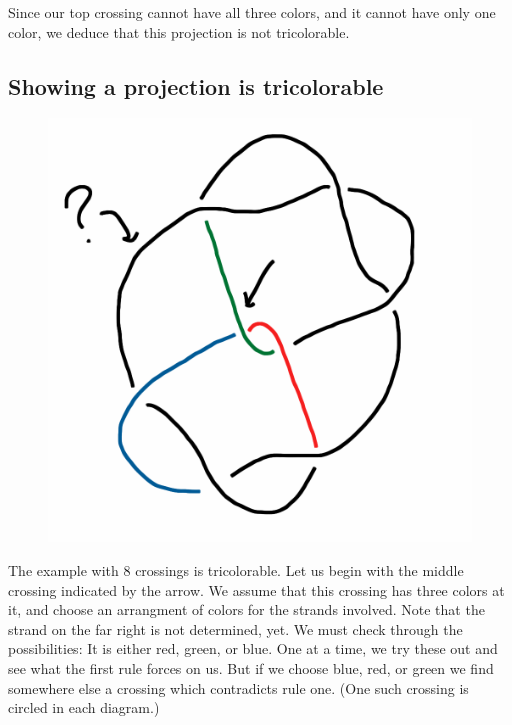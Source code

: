 \documentclass[12pt,letterpaper]{article}
\theoremstyle{definition}
\begin{document}
Since our top crossing cannot have all three colors, and it cannot have only one color, we deduce that this projection is not tricolorable.

\subsection*{Showing a projection is tricolorable}

\begin{figure}
    \centering
    \includegraphics[width=.3\textwidth]{knotpics/colorable1.png}
\end{figure}
The example with 8 crossings is tricolorable.
Let us begin with the middle crossing indicated by the arrow.
We assume that this crossing has three colors at it, and choose an arrangment of colors for the strands involved.
Note that the strand on the far right is not determined, yet.
We must check through the possibilities: It is either red, green, or blue. 
One at a time, we try these out and see what the first rule forces on us.
But if we choose blue, red, or green we find somewhere else a crossing which contradicts rule one.
(One such crossing is circled in each diagram.)
\end{document}
